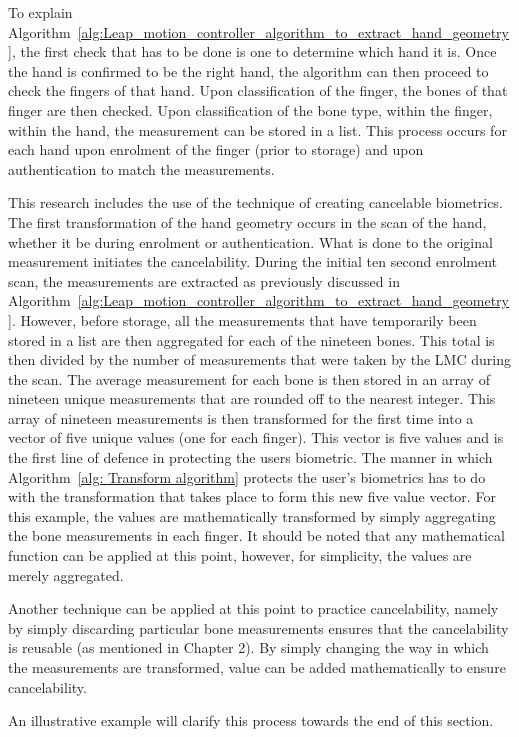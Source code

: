 To explain Algorithm~\ref{alg:Leap_motion_controller_algorithm_to_extract_hand_geometry}, the first check that has to be done is one to determine which hand it is. Once the hand is confirmed to be the right hand, the algorithm can then proceed to check the fingers of that hand. Upon classification of the finger, the bones of that finger are then checked. Upon classification of the bone type, within the finger, within the hand, the measurement can be stored in a list. This process occurs for each hand upon enrolment of the finger (prior to storage) and upon authentication to match the measurements.

This research includes the use of the technique of creating cancelable biometrics. The first transformation of the hand geometry occurs in the scan of the hand, whether it be during enrolment or authentication. What is done to the original measurement initiates the cancelability. During the initial ten second enrolment scan, the measurements are extracted as previously discussed in Algorithm~\ref{alg:Leap_motion_controller_algorithm_to_extract_hand_geometry}. However, before storage, all the measurements that have temporarily been stored in a list are then aggregated for each of the nineteen bones. This total is then divided by the number of measurements that were taken by the LMC during the scan. The average measurement for each bone is then stored in an array of nineteen unique measurements that are rounded off to the nearest integer. This array of nineteen measurements is then transformed for the first time into a vector of five unique values (one for each finger). This vector is five values and is the first line of defence in protecting the users biometric. The manner in which Algorithm~\ref{alg: Transform algorithm} protects the user's biometrics has to do with the transformation that takes place to form this new five value vector. For this example, the values are mathematically transformed by simply aggregating the bone measurements in each finger. It should be noted that any mathematical function can be applied at this point, however, for simplicity, the values are merely aggregated. 

Another technique can be applied at this point to practice cancelability, namely by simply discarding particular bone measurements ensures that the cancelability is reusable (as mentioned in Chapter 2). By simply changing the way in which the measurements are transformed, value can be added mathematically to ensure cancelability. 

An illustrative example will clarify this process towards the end of this section.\\

